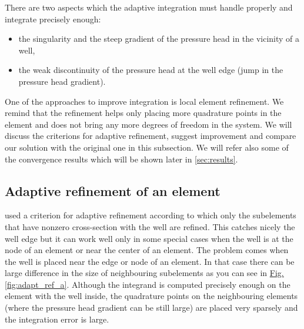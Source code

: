 \documentclass[preprint,12pt,authoryear]{elsarticle}
\newcommand{\fig}[1]{\hyperref[#1]{Fig.\ref{#1}}}
\begin{document}
There are two aspects which the adaptive integration must handle properly and integrate precisely enough:
\begin{itemize}
  \item the singularity and the steep gradient of the pressure head in the vicinity of a well,
  \item the weak discontinuity of the pressure head at the well edge (jump in the pressure head gradient).
\end{itemize}

One of the approaches to improve integration is local element refinement. We remind that the refinement helps
only placing more quadrature points in the element and does not bring any more degrees of freedom in the 
system. We will discuss the criterions for adaptive refinement, suggest improvement and compare our solution
with the original one in this subsection. We will refer also some of the convergence results which will be 
shown later in \ref{sec:results}.

\subsection{Adaptive refinement of an element}
\label{sec:refinement_element}

\cite{gracie} used a criterion for adaptive refinement according to which only the subelements 
that have nonzero cross-section with the well are refined. This catches nicely the well edge but it can work 
well only in some special cases when the well is at the node of an element or near the center of an element. 
The problem comes when the well is placed near the edge or node of an element. In that case there can be
large difference in the size of neighbouring subelements as you can see in \fig{fig:adapt_ref_a}. Although
the integrand is computed precisely enough on the element with the well inside, the quadrature points on the
neighbouring elements (where the pressure head gradient can be still large) are placed very sparsely 
and the integration error is large.
\end{document}
